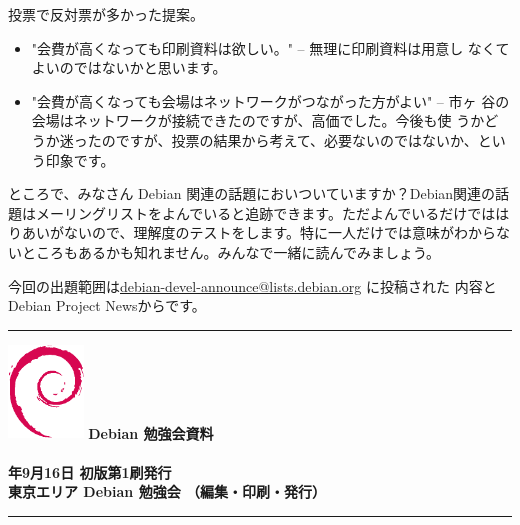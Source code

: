\documentclass[mingoth,a4paper]{jsarticle}
\newcommand{\debmtgyear}{2009}
\newcommand{\debmtgmonth}{9}
\newcommand{\debmtgdate}{16}
\begin{document}
投票で反対票が多かった提案。

\begin{itemize}
 	
 \item "会費が高くなっても印刷資料は欲しい。" -- 無理に印刷資料は用意し
       なくてよいのではないかと思います。
 \item "会費が高くなっても会場はネットワークがつながった方がよい" -- 市ヶ
       谷の会場はネットワークが接続できたのですが、高価でした。今後も使
       うかどうか迷ったのですが、投票の結果から考えて、必要ないのではないか、という印象です。
\end{itemize}


ところで、みなさん Debian 関連の話題においついていますか？Debian関連の話
題はメーリングリストをよんでいると追跡できます。ただよんでいるだけではは
りあいがないので、理解度のテストをします。特に一人だけでは意味がわからな
いところもあるかも知れません。みんなで一緒に読んでみましょう。

今回の出題範囲は\url{debian-devel-announce@lists.debian.org} に投稿された
内容とDebian Project Newsからです。

% 



\clearpage


\cleartooddpage

\vspace*{15cm}
\hrule
\vspace{2mm}
\includegraphics[width=2cm]{image200502/openlogo-nd.eps}
\noindent \Large \bf Debian 勉強会資料\\ \\
\noindent \normalfont \debmtgyear{}年\debmtgmonth{}月\debmtgdate{}日 \hspace{5mm}  初版第1刷発行\\
\noindent \normalfont 東京エリア Debian 勉強会 （編集・印刷・発行）\\
\hrule
\end{document}
